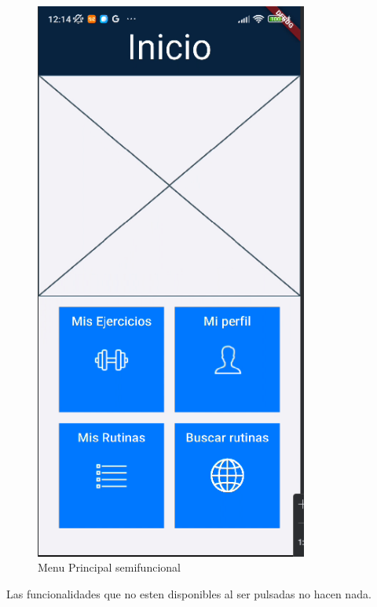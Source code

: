 \begin{figure}[H]
   \centering
    \includegraphics[width=0.8\textwidth]{pantallas/MenuPrincipalSemi.png}
    \caption{Menu Principal semifuncional}
    \label{fig:MenuPrincipalSemi}
\end{figure}

Las funcionalidades que no esten disponibles al ser pulsadas no hacen nada.

